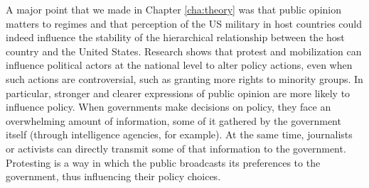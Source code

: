 		
		A major point that we made in Chapter \ref{cha:theory} was that public opinion matters to regimes and that perception of the US military in host countries could indeed influence the stability of the hierarchical relationship between the host country and the United States. Research shows that protest and mobilization can influence political actors at the national level to alter policy actions, even when such actions are controversial, such as granting more rights to minority groups.\cite{Gillion2013,Fassiotto2017} In particular, stronger and clearer expressions of public opinion are more likely to influence policy.\cite{Baumgartner2015,Fassiotto2017} When governments make decisions on policy, they face an overwhelming amount of information, some of it gathered by the government itself (through intelligence agencies, for example). At the same time, journalists or activists can directly transmit some of that information to the government.\cite[p. 15]{Baumgartner2015} Protesting is a way in which the public broadcasts its preferences to the government, thus influencing their policy choices. 
		
